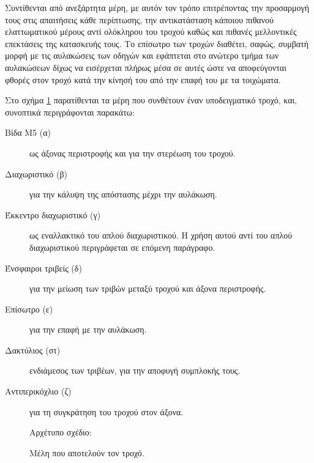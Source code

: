 Συντίθενται από ανεξάρτητα μέρη, με αυτόν τον τρόπο επιτρέποντας την προσαρμογή
τους στις απαιτήσεις κάθε περίπτωσης, την αντικατάσταση κάποιου πιθανού
ελαττωματικού μέρους αντί ολόκληρου του τροχού καθώς και πιθανές μελλοντικές
επεκτάσεις της κατασκευής τους.
Το επίσωτρο των τροχών διαθέτει, σαφώς, συμβατή μορφή με τις αυλακώσεις των
οδηγών και εφάπτεται στο ανώτερο τμήμα των αυλακώσεων δίχως να εισέρχεται πλήρως
μέσα σε αυτές ώστε να αποφεύγονται φθορές στον τροχό κατά την κίνησή του από την
επαφή του με τα τοιχώματα.

Στο σχήμα \ref{fig:construct:wheel_exploded} παρατίθενται τα μέρη που συνθέτουν
έναν υποδειγματικό τροχό, και, συνοπτικά περιγράφονται παρακάτω:
\begin{flushleft}
\begin{description}
    \item[Βίδα M5 (α)] ως άξονας περιστροφής και για την στερέωση του τροχού.
    \item[Διαχωριστικό (β)] για την κάλυψη της απόστασης μέχρι την αυλάκωση.
    \item[Έκκεντρο διαχωριστικό (γ)] ως εναλλακτικό του απλού διαχωριστικού. Η
    χρήση αυτού αντί του απλού διαχωριστικού περιγράφεται σε επόμενη παράγραφο.
    \item[Ένσφαιροι τριβείς (δ)] για την μείωση των τριβών μεταξύ τροχού και
    άξονα περιστροφής.
    \item[Επίσωτρο (ε)] για την επαφή με την αυλάκωση.
    \item[Δακτύλιος (στ)] ενδιάμεσος των τριβέων, για την αποφυγή συμπλοκής
    τους.
    \item[Αντιπερικόχλιο (ζ)] για τη συγκράτηση του τροχού στον άξονα.
\end{description}
\end{flushleft}

\begin{figure}
    \caption{Μέλη που αποτελούν τον τροχό.\label{fig:construct:wheel_exploded}}
    \begin{center}%
    \def\svgwidth{0.8\textwidth}
    
    \end{center}
    Αρχέτυπο σχέδιο:
\end{figure}

